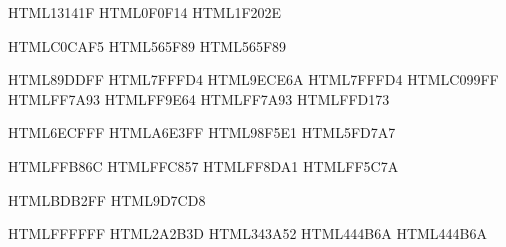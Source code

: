 \definecolor{tnBg}        {HTML}{13141F}   %
\definecolor{tnBgDark}    {HTML}{0F0F14}   %
\definecolor{tnBgHL}      {HTML}{1F202E}   %

\definecolor{tnFg}        {HTML}{C0CAF5}   %
\definecolor{tnFgDark}    {HTML}{565F89}   %
\definecolor{tnComment}   {HTML}{565F89}   %

\definecolor{tnBlue}      {HTML}{89DDFF}   %
\definecolor{tnCyan}      {HTML}{7FFFD4}   %
\definecolor{tnGreen}     {HTML}{9ECE6A}   %
\definecolor{tnTeal}      {HTML}{7FFFD4}   %
\definecolor{tnPurple}    {HTML}{C099FF}   %
\definecolor{tnMagenta}   {HTML}{FF7A93}   %
\definecolor{tnOrange}    {HTML}{FF9E64}   %
\definecolor{tnRed}       {HTML}{FF7A93}   %
\definecolor{tnYellow}    {HTML}{FFD173}   %

\definecolor{tnSky}       {HTML}{6ECFFF}   %
\definecolor{tnIce}       {HTML}{A6E3FF}   %
\definecolor{tnMint}      {HTML}{98F5E1}   %
\definecolor{tnEmerald}   {HTML}{5FD7A7}   %

\definecolor{tnPeach}     {HTML}{FFB86C}   %
\definecolor{tnAmber}     {HTML}{FFC857}   %
\definecolor{tnRose}      {HTML}{FF8DA1}   %
\definecolor{tnCrimson}   {HTML}{FF5C7A}   %

\definecolor{tnLavender}  {HTML}{BDB2FF}   %
\definecolor{tnViolet}    {HTML}{9D7CD8}   %

\definecolor{tnWhite}     {HTML}{FFFFFF}   %
\definecolor{tnSurface0}  {HTML}{2A2B3D}   %
\definecolor{tnSurface1}  {HTML}{343A52}   %
\definecolor{tnOverlay0}  {HTML}{444B6A}   %
\definecolor{tnOverlay2}  {HTML}{444B6A}   %

